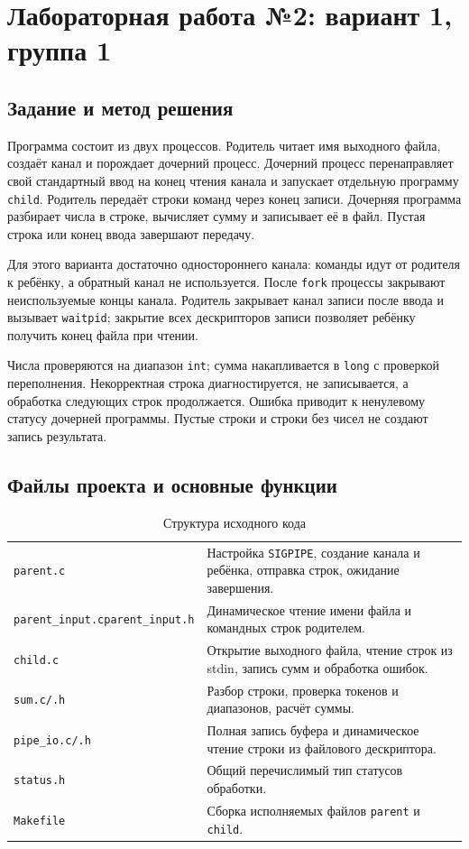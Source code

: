 \documentclass[12pt,a4paper]{article}
\begin{document}
\section{Лабораторная работа №2: вариант 1, группа 1}

\subsection{Задание и метод решения}

Программа состоит из двух процессов. Родитель читает имя выходного файла, создаёт канал и порождает дочерний процесс. Дочерний процесс перенаправляет свой стандартный ввод на конец чтения канала и запускает отдельную программу \texttt{child}. Родитель передаёт строки команд через конец записи. Дочерняя программа разбирает числа в строке, вычисляет сумму и записывает её в файл. Пустая строка или конец ввода завершают передачу.

Для этого варианта достаточно одностороннего канала: команды идут от родителя к ребёнку, а обратный канал не используется. После \texttt{fork} процессы закрывают неиспользуемые концы канала. Родитель закрывает канал записи после ввода и вызывает \texttt{waitpid}; закрытие всех дескрипторов записи позволяет ребёнку получить конец файла при чтении.

Числа проверяются на диапазон \texttt{int}; сумма накапливается в \texttt{long} с проверкой переполнения. Некорректная строка диагностируется, не записывается, а обработка следующих строк продолжается. Ошибка приводит к ненулевому статусу дочерней программы. Пустые строки и строки без чисел не создают запись результата.

\subsection{Файлы проекта и основные функции}

\begin{table}[H]
\caption{Структура исходного кода}
\begin{tabularx}{\linewidth}{|P{3.2cm}|L|}
\hline
{} & \tabularnewline \hline
\texttt{parent.c} & Настройка \texttt{SIGPIPE}, создание канала и ребёнка, отправка строк, ожидание завершения. \\ \hline
\texttt{parent\_input.c}\newline\texttt{parent\_input.h} & Динамическое чтение имени файла и командных строк родителем. \\ \hline
\texttt{child.c} & Открытие выходного файла, чтение строк из stdin, запись сумм и обработка ошибок. \\ \hline
\texttt{sum.c/.h} & Разбор строки, проверка токенов и диапазонов, расчёт суммы. \\ \hline
\texttt{pipe\_io.c/.h} & Полная запись буфера и динамическое чтение строки из файлового дескриптора. \\ \hline
\texttt{status.h} & Общий перечислимый тип статусов обработки. \\ \hline
\texttt{Makefile} & Сборка исполняемых файлов \texttt{parent} и \texttt{child}. \\ \hline
\end{tabularx}
\end{table}
\end{document}
